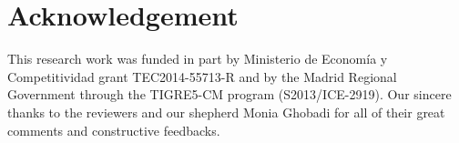 \documentclass[10pt]{sig-alternate-05-2015}
\begin{document}
\section*{Acknowledgement}
This research work was funded in part by Ministerio de Econom\'ia y Competitividad grant TEC2014-55713-R and by the Madrid Regional Government through the TIGRE5-CM program \newline (S2013/ICE-2919). Our sincere thanks to the reviewers and our shepherd Monia Ghobadi for all of their great comments and constructive feedbacks.


\balance


\end{document}
